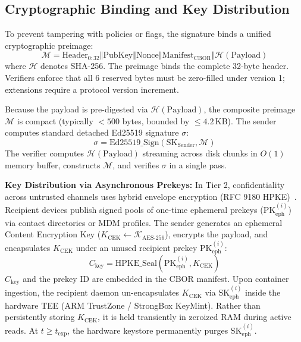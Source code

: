 \subsection{Cryptographic Binding and Key Distribution}
To prevent tampering with policies or flags, the signature binds a unified cryptographic preimage:
\begin{equation}
    \mathcal{M} = \text{Header}_{0:32} \mathbin{\Vert} \text{PubKey} \mathbin{\Vert} \text{Nonce} \mathbin{\Vert} \text{Manifest}_{\text{CBOR}} \mathbin{\Vert} \mathcal{H}(\text{Payload})
\end{equation}
where $\mathcal{H}$ denotes SHA-256. The preimage binds the complete 32-byte header. Verifiers enforce that all 6 reserved bytes must be zero-filled under version 1; extensions require a protocol version increment.

Because the payload is pre-digested via $\mathcal{H}(\text{Payload})$, the composite preimage $\mathcal{M}$ is compact (typically $<500$ bytes, bounded by $\le 4.2$\,KB). The sender computes standard detached Ed25519 signature $\sigma$:
\begin{equation}
    \sigma = \text{Ed25519\_Sign}(\text{SK}_{\text{Sender}}, \mathcal{M})
\end{equation}
The verifier computes $\mathcal{H}(\text{Payload})$ streaming across disk chunks in $O(1)$ memory buffer, constructs $\mathcal{M}$, and verifies $\sigma$ in a single pass.

\textbf{Key Distribution via Asynchronous Prekeys:} In Tier 2, confidentiality across untrusted channels uses hybrid envelope encryption (RFC 9180 HPKE)~\cite{rfc9180hpke}. Recipient devices publish signed pools of one-time ephemeral prekeys ($\text{PK}_{\text{eph}}^{(i)}$) via contact directories or MDM profiles. The sender generates an ephemeral Content Encryption Key ($K_{\text{CEK}} \leftarrow \mathcal{K}_{\text{AES-256}}$), encrypts the payload, and encapsulates $K_{\text{CEK}}$ under an unused recipient prekey $\text{PK}_{\text{eph}}^{(i)}$:
\begin{equation}
    C_{\text{key}} = \text{HPKE\_Seal}(\text{PK}_{\text{eph}}^{(i)}, K_{\text{CEK}})
\end{equation}
$C_{\text{key}}$ and the prekey ID are embedded in the CBOR manifest. Upon container ingestion, the recipient daemon un-encapsulates $K_{\text{CEK}}$ via $\text{SK}_{\text{eph}}^{(i)}$ inside the hardware TEE (ARM TrustZone / StrongBox KeyMint). Rather than persistently storing $K_{\text{CEK}}$, it is held transiently in zeroized RAM during active reads. At $t \ge t_{\text{exp}}$, the hardware keystore permanently purges $\text{SK}_{\text{eph}}^{(i)}$.

